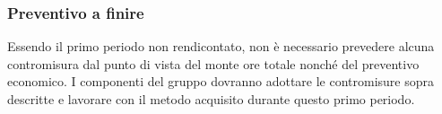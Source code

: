 \subsubsection{Preventivo a finire} 
Essendo il primo periodo non rendicontato, non è necessario prevedere alcuna contromisura dal punto di vista del monte ore totale nonché del preventivo economico. I componenti del gruppo dovranno adottare le contromisure sopra descritte e lavorare con il metodo acquisito durante questo primo periodo.


